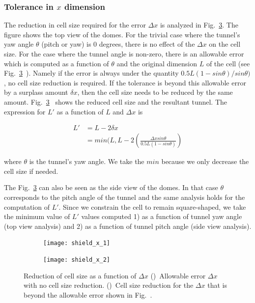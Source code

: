 \documentclass[a4paper]{report}
\begin{document}
\subsubsection{Tolerance in $x$ dimension}
The reduction in cell size required for the error $\Delta x$ is analyzed in Fig.~\ref{fig:shield_x}. The figure shows the top view of the domes. For the trivial case where the tunnel's yaw angle $\theta$ (pitch or yaw) is 0 degrees, there is no effect of the $\Delta x$ on the cell size. 
For the case where the tunnel angle is non-zero, there is an allowable error which is computed as a function of $\theta$ and the original dimension $L$ of the cell (see Fig.~\ref{fig:shield_x}~). Namely if the error is always under the quantity $0.5L(1 -sin \theta) / sin \theta)$, no cell size reduction is required.
If the tolerance is beyond this allowable error by a surplass amount $\delta x$, then the cell size needs to be reduced by the same amount. Fig.~\ref{fig:shield_x}~ shows the reduced cell size and the resultant tunnel. The expression for $L'$ as a function of $L$ and $\Delta x$ is

\begin{equation} \label{eq1}
\begin{split}
L' & = L - 2 \delta x \\
   & = min(L, L - 2(\frac{\Delta x sin \theta} {0.5L (1 - sin \theta)})
\end{split}
\end{equation}

where $\theta$ is the tunnel's yaw angle. We take the $min$ because we only decrease the cell size if needed.

The Fig.~\ref{fig:shield_x} can also be seen as the side view of the domes. In that case $\theta$ corresponds to the pitch angle of the tunnel and the same analysis holds for the computation of $L'$.
%
Since we constrain the cell to remain square-shaped, we take the minimum value of $L'$ values computed 1) as a function of tunnel yaw angle (top view analysis) and 2) as a function of tunnel pitch angle (side view analysis).

\begin{figure}[ht]
    \centering
    \begin{subfigure}{0.48\textwidth}
        \texttt{[image: shield\_x\_1]}
        \caption{}
        \label{fig:shield_xa}
    \end{subfigure} 
    \begin{subfigure}{0.48\textwidth}
        \texttt{[image: shield\_x\_2]}
        \caption{}
        \label{fig:shield_xb}
    \end{subfigure}
    \caption{
    Reduction of cell size as a function of $\Delta x$
     ()~Allowable error $\Delta x$ with no cell size reduction.
    ()~Cell size reduction for the $\Delta x$ that is beyond the allowable error shown in Fig.~.
    }
\label{fig:shield_x}
\end{figure}
\end{document}
